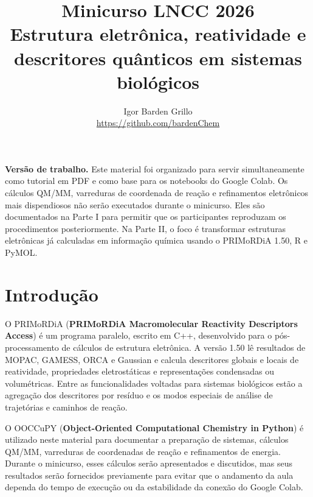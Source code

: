 \documentclass[a4paper,11pt]{refart}
\title{\huge Minicurso LNCC 2026\\[0.4em]
\Large Estrutura eletrônica, reatividade e descritores quânticos em sistemas biológicos}
\author{Igor Barden Grillo\\
\url{https://github.com/bardenChem}}
\begin{document}
\maketitle

\begin{center}
\begin{tcolorbox}[width=0.94\textwidth,colback=yellow!7,colframe=orange!45!black]
\textbf{Versão de trabalho.} Este material foi organizado para servir simultaneamente como tutorial em PDF e como base para os notebooks do Google Colab. Os cálculos QM/MM, varreduras de coordenada de reação e refinamentos eletrônicos mais dispendiosos não serão executados durante o minicurso. Eles são documentados na Parte I para permitir que os participantes reproduzam os procedimentos posteriormente. Na Parte II, o foco é transformar estruturas eletrônicas já calculadas em informação química usando o PRIMoRDiA 1.50, R e PyMOL.
\end{tcolorbox}
\end{center}

\tableofcontents
\newpage

\section*{Introdução}

O PRIMoRDiA (\textbf{PRIMoRDiA Macromolecular Reactivity Descriptors Access}) é um programa paralelo, escrito em C++, desenvolvido para o pós-processamento de cálculos de estrutura eletrônica. A versão 1.50 lê resultados de MOPAC, GAMESS, ORCA e Gaussian e calcula descritores globais e locais de reatividade, propriedades eletrostáticas e representações condensadas ou volumétricas. Entre as funcionalidades voltadas para sistemas biológicos estão a agregação dos descritores por resíduo e os modos especiais de análise de trajetórias e caminhos de reação.

O OOCCuPY (\textbf{Object-Oriented Computational Chemistry in Python}) é utilizado neste material para documentar a preparação de sistemas, cálculos QM/MM, varreduras de coordenadas de reação e refinamentos de energia. Durante o minicurso, esses cálculos serão apresentados e discutidos, mas seus resultados serão fornecidos previamente para evitar que o andamento da aula dependa do tempo de execução ou da estabilidade da conexão do Google Colab.
\end{document}
